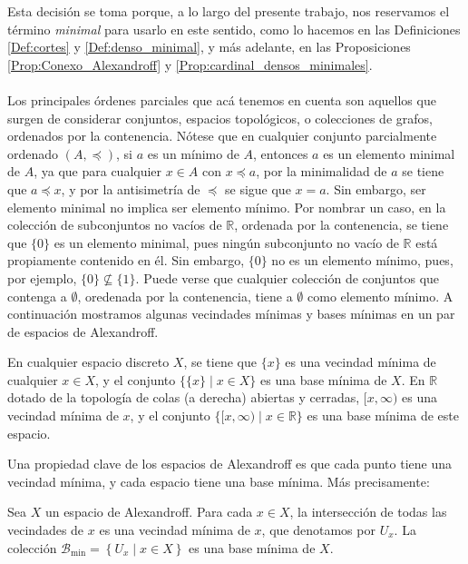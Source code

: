 Esta decisión se toma porque, a lo largo del presente trabajo, nos reservamos el término \textit{minimal} para usarlo en este sentido, como lo hacemos en las Definiciones \ref{Def:cortes} y \ref{Def:denso_minimal}, y más adelante, en las Proposiciones \ref{Prop:Conexo_Alexandroff} y \ref{Prop:cardinal_densos_minimales}.\\\\ 
Los principales órdenes parciales que acá tenemos en cuenta son aquellos que surgen de considerar conjuntos, espacios topológicos, o colecciones de grafos, ordenados por la contenencia. Nótese que en cualquier conjunto parcialmente ordenado $(A,\preccurlyeq)$, si $a$ es un mínimo de $A$, entonces $a$ es un elemento minimal de $A$, ya que para cualquier $x\in A$ con $x\preccurlyeq a$, por la minimalidad de $a$ se tiene que $a\preccurlyeq x$, y por la antisimetría de $\preccurlyeq$ se sigue que $x=a$. Sin embargo, ser elemento minimal no implica ser elemento mínimo. Por nombrar un caso, en la colección de subconjuntos no vacíos de $\mathbb{R}$, ordenada por la contenencia, se tiene que $\{0\}$ es un elemento minimal, pues ningún subconjunto no vacío de $\mathbb{R}$ está propiamente contenido en él. Sin embargo, $\{0\}$ no es un elemento mínimo, pues, por ejemplo, $\{0\}\nsubseteq \{1\}$. Puede verse que cualquier colección de conjuntos que contenga a $\emptyset$, oredenada por la contenencia, tiene a $\emptyset$ como elemento mínimo. A continuación mostramos algunas vecindades mínimas y bases mínimas en un par de espacios de Alexandroff.
\begin{Ejm}
   En cualquier espacio discreto $X$, se tiene que $\{x\}$ es una vecindad mínima de cualquier $x\in X$, y el conjunto $\{\{x\}\mid x\in X\}$ es una base mínima de $X$. En $\mathbb{R}$ dotado de la topología de colas (a derecha) abiertas y cerradas, $[x,\infty)$ es una vecindad mínima de $x$, y el conjunto $\{[x,\infty)\mid x\in \mathbb{R}\}$ es una base mínima de este espacio. 
\end{Ejm}
Una propiedad clave de los espacios de Alexandroff es que cada punto tiene una vecindad mínima, y cada espacio tiene una base mínima. Más precisamente:
\begin{Prop}\label{Prop:vecindades_bases_minimas}
   Sea $X$ un espacio de Alexandroff. Para cada $x\in X$, la intersección de todas las vecindades de $x$ es una vecindad mínima de $x$, que denotamos por $U_x$. La colección $\mathcal{B}_{\min}=\left\lbrace U_x\mid x\in X\right\rbrace$ es una base mínima de $X$.
\end{Prop}
